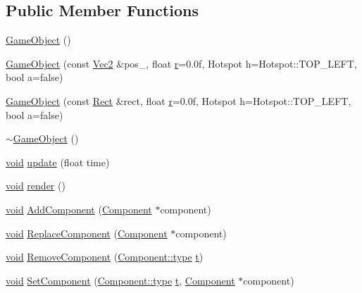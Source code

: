 \subsection*{Public Member Functions}
\begin{DoxyCompactItemize}
\item 
\hyperlink{class_game_object_a0348e3ee2e83d56eafca7a3547f432c4}{Game\-Object} ()
\item 
\hyperlink{class_game_object_ae1aec0d07645812478ea21d13a016f3f}{Game\-Object} (const \hyperlink{class_vec2}{Vec2} \&pos\-\_\-, float \hyperlink{_s_d_l__opengl_8h_a42ce7cdc612e53abee15043f80220d97}{r}=0.\-0f, Hotspot h=\-Hotspot\-::\-T\-O\-P\-\_\-\-L\-E\-F\-T, bool a=false)
\item 
\hyperlink{class_game_object_a6175e45e39e7ff2f659b9ae345e95951}{Game\-Object} (const \hyperlink{class_rect}{Rect} \&rect, float \hyperlink{_s_d_l__opengl_8h_a42ce7cdc612e53abee15043f80220d97}{r}=0.\-0f, Hotspot h=\-Hotspot\-::\-T\-O\-P\-\_\-\-L\-E\-F\-T, bool a=false)
\item 
\hyperlink{class_game_object_ab82dfdb656f9051c0587e6593b2dda97}{$\sim$\-Game\-Object} ()
\item 
\hyperlink{_s_d_l__opengles2__gl2ext_8h_ae5d8fa23ad07c48bb609509eae494c95}{void} \hyperlink{class_game_object_aecdbe6a05d3183236f1bbec09fa235f8}{update} (float time)
\item 
\hyperlink{_s_d_l__opengles2__gl2ext_8h_ae5d8fa23ad07c48bb609509eae494c95}{void} \hyperlink{class_game_object_a554078170496d6fc31af134e76e1e1bd}{render} ()
\item 
\hyperlink{_s_d_l__opengles2__gl2ext_8h_ae5d8fa23ad07c48bb609509eae494c95}{void} \hyperlink{class_game_object_a6de86477e37962bcd4738b09c1c706aa}{Add\-Component} (\hyperlink{class_component}{Component} $\ast$component)
\item 
\hyperlink{_s_d_l__opengles2__gl2ext_8h_ae5d8fa23ad07c48bb609509eae494c95}{void} \hyperlink{class_game_object_a3e62d0cc338865a242977307910c9daf}{Replace\-Component} (\hyperlink{class_component}{Component} $\ast$component)
\item 
\hyperlink{_s_d_l__opengles2__gl2ext_8h_ae5d8fa23ad07c48bb609509eae494c95}{void} \hyperlink{class_game_object_a08d849601da7aa4be5d64492b728c967}{Remove\-Component} (\hyperlink{class_component_ad6d161b6acf7b843b55bb9feac7af71a}{Component\-::type} \hyperlink{_s_d_l__opengl_8h_a7d65d00ca3b0630d9b5c52df855b19f5}{t})
\item 
\hyperlink{_s_d_l__opengles2__gl2ext_8h_ae5d8fa23ad07c48bb609509eae494c95}{void} \hyperlink{class_game_object_abd34998206c99332aef59a4271baa0b4}{Set\-Component} (\hyperlink{class_component_ad6d161b6acf7b843b55bb9feac7af71a}{Component\-::type} \hyperlink{_s_d_l__opengl_8h_a7d65d00ca3b0630d9b5c52df855b19f5}{t}, \hyperlink{class_component}{Component} $\ast$component)

\end{DoxyCompactItemize}
